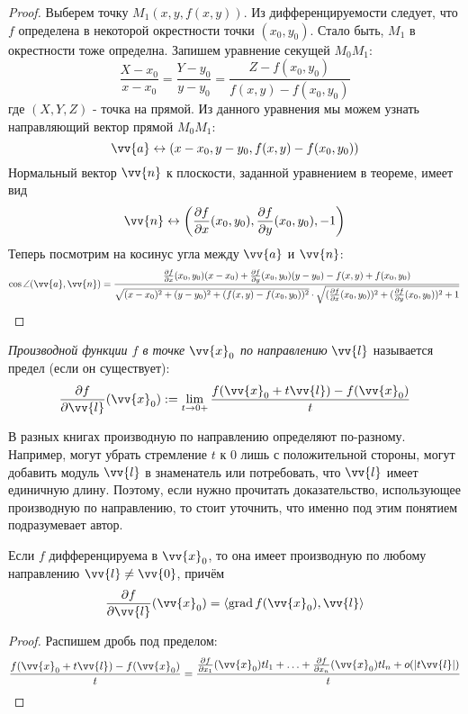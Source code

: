 \begin{proof}
	Выберем точку $M_1(x, y, f(x, y))$. Из дифференцируемости следует, что $f$ определена в некоторой окрестности точки $(x_0, y_0)$. Стало быть, $M_1$ в окрестности тоже определна. Запишем уравнение секущей $M_0 M_1$:
	\[
		\frac{X - x_0}{x - x_0} = \frac{Y - y_0}{y - y_0} = \frac{Z - f(x_0, y_0)}{f(x, y) - f(x_0, y_0)}
	\]
	где $(X, Y, Z)$ - точка на прямой. Из данного уравнения мы можем узнать направляющий вектор прямой $M_0 M_1$:
	\[
		\vv{a} \leftrightarrow (x - x_0, y - y_0, f(x, y) - f(x_0, y_0))
	\]
	Нормальный вектор $\vv{n}$ к плоскости, заданной уравнением в теореме, имеет вид
	\[
		\vv{n} \leftrightarrow \left(\pd{f}{x} (x_0, y_0), \pd{f}{y} (x_0, y_0), -1\right)
	\]
	Теперь посмотрим на косинус угла между $\vv{a}$ и $\vv{n}$:
	\[
		\cos \angle (\vv{a}, \vv{n}) = \frac{\pd{f}{x} (x_0, y_0)(x - x_0) + \pd{f}{y} (x_0, y_0)(y - y_0) - f(x, y) + f(x_0, y_0)}{\sqrt{(x - x_0)^2 + (y - y_0)^2 + (f(x, y) - f(x_0, y_0))^2} \cdot \sqrt{(\pd{f}{x} (x_0, y_0))^2 + (\pd{f}{y} (x_0, y_0))^2 + 1}}
	\]
\end{proof}

\begin{definition}
	\textit{Производной функции $f$ в точке $\vv{x}_0$ по направлению} $\vv{l}$ называется предел (если он существует):
	\[
		\pd{f}{\vv{l}} (\vv{x}_0) := \liml_{t \to 0+} \frac{f(\vv{x}_0 + t\vv{l}) - f(\vv{x}_0)}{t}
	\]
\end{definition}

\begin{note}
	В разных книгах производную по направлению определяют по-разному. Например, могут убрать стремление $t$ к 0 лишь с положительной стороны, могут добавить модуль $\vv{l}$ в знаменатель или потребовать, что $\vv{l}$ имеет единичную длину. Поэтому, если нужно прочитать доказательство, использующее производную по направлению, то стоит уточнить, что именно под этим понятием подразумевает автор.
\end{note}

\begin{proposition}
	Если $f$ дифференцируема в $\vv{x}_0$, то она имеет производную по любому направлению $\vv{l} \neq \vv{0}$, причём
	\[
		\pd{f}{\vv{l}} (\vv{x}_0) = \trbr{\grad f(\vv{x}_0), \vv{l}}
	\]
\end{proposition}

\begin{proof}
	Распишем дробь под пределом:
	\[
		\frac{f(\vv{x}_0 + t\vv{l}) - f(\vv{x}_0)}{t} = \frac{\pd{f}{x_1} (\vv{x}_0) tl_1 + \ldots + \pd{f}{x_n} (\vv{x}_0)tl_n + o(|t\vv{l}|)}{t}
	\]
\end{proof}

